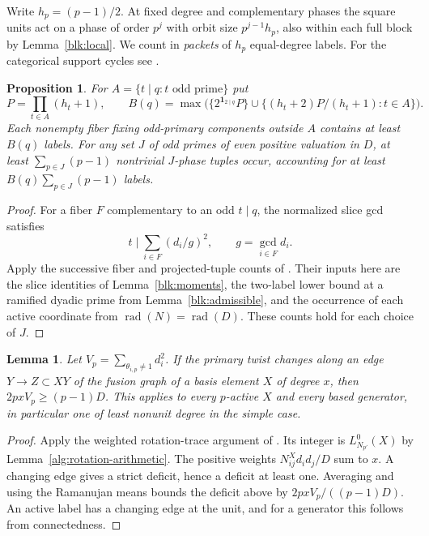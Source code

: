 \documentclass[11pt]{amsart}
\numberwithin{equation}{section}
\newtheorem{lemma}[theorem]{Lemma}
\newtheorem{proposition}[theorem]{Proposition}
\theoremstyle{definition}
\theoremstyle{plain}
\begin{document}
Write $h_p=(p-1)/2$. At fixed degree and complementary phases the
square units act on a phase of order $p^j$ with orbit size
$p^{j-1}h_p$, also within each full block by Lemma~\ref{blk:local}.
We count in \emph{packets} of $h_p$ equal-degree labels. For the
categorical support cycles see \cite[Lemmas~4.6--4.7]{BGNPRW}.

\begin{proposition}\label{blk:packets}
For $A=\{t\mid q:t\text{ odd prime}\}$ put
\[
 P=\prod_{t\in A}(h_t+1),\qquad
 B(q)=\max\bigl(\{2^{\mathbf1_{2\mid q}}P\}\cup
      \{(h_t+2)P/(h_t+1):t\in A\}\bigr).
\]
Each nonempty fiber fixing odd-primary components outside $A$ contains
at least $B(q)$ labels. For any set $J$ of odd primes of even positive
valuation in $D$, at least $\sum_{p\in J}(p-1)$ nontrivial $J$-phase
tuples occur, accounting for at least $B(q)\sum_{p\in J}(p-1)$ labels.
\end{proposition}
\begin{proof}
For a fiber $F$ complementary to an odd $t\mid q$, the normalized slice gcd
satisfies \cite[Lemma~19.2]{BDPcore}
\begin{equation}\label{blk:fibergcd}
 t\mid\sum_{i\in F}(d_i/g)^2,\qquad g=\gcd_{i\in F}d_i .
\end{equation}
Apply the successive fiber and projected-tuple counts of
\cite[\S19.2 and Proposition~19.8]{BDPcore}. Their inputs here are
the slice identities of Lemma~\ref{blk:moments}, the two-label lower
bound at a ramified dyadic prime from Lemma~\ref{blk:admissible},
and the occurrence of each active coordinate from $\operatorname{rad}(N)=
\operatorname{rad}(D)$. These counts hold for each choice of $J$.
\end{proof}

\begin{lemma}\label{blk:activity}
Let $V_p=\sum_{\theta_{i,p}\ne1}d_i^2$. If the primary twist changes
along an edge $Y\to Z\subset XY$ of the fusion graph of a basis
element $X$ of degree $x$, then $2pxV_p\ge(p-1)D$. This applies to
every $p$-active $X$ and every based generator, in particular one of
least nonunit degree in the simple case.
\end{lemma}
\begin{proof}
Apply the weighted rotation-trace argument of \cite[Proposition~3.8]{BDPcore}. Its integer is $L_{N_{p'}}^0(X)$ by Lemma~\ref{alg:rotation-arithmetic}. The positive weights $N_{ij}^X d_i d_j/D$ sum to $x$. A changing edge gives a strict deficit, hence a deficit at least one. Averaging and using the Ramanujan means bounds the deficit above by $2pxV_p/((p-1)D)$. An active label has a changing edge at the unit, and for a generator this follows from connectedness.
\end{proof}
\end{document}
